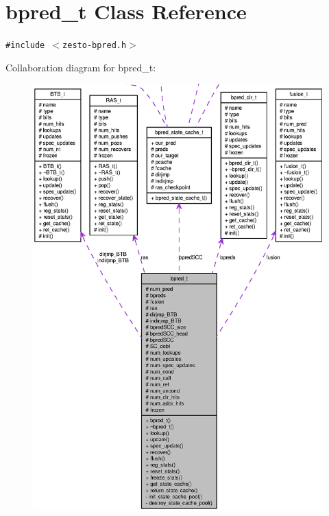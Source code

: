 \section{bpred\_\-t Class Reference}
\label{classbpred__t}
{\tt \#include $<$zesto-bpred.h$>$}

Collaboration diagram for bpred\_\-t:\nopagebreak
\begin{figure}[H]
\begin{center}
\leavevmode
\includegraphics[width=400pt]{classbpred__t__coll__graph}
\end{center}
\end{figure}
